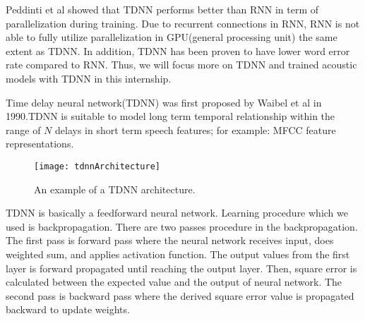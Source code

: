 Peddinti et al showed that TDNN performs better than RNN in term of parallelization during training\cite{Peddinti2015ATD}. Due to recurrent connections in RNN, RNN is not able to fully utilize parallelization in GPU(general processing unit) the same extent as TDNN. In addition, TDNN has been proven to have lower word error rate compared to RNN\cite{Peddinti2015ATD}. Thus, we will focus more on TDNN and trained acoustic models with TDNN in this internship.

Time delay neural network(TDNN) was first proposed by Waibel et al in 1990\cite{Waibel:1990:PRU:108235.108263}.TDNN is suitable to model long term temporal relationship within the range of $N$ delays in short term speech features; for example: MFCC feature representations. %


\begin{figure}

\caption{An example of a TDNN architecture. \cite{Peddinti2015ATD}}
\texttt{[image: tdnnArchitecture]}
\label{tdnnArchitecture}
\centering
\end{figure}



TDNN is basically a feedforward neural network. Learning procedure which we used is backpropagation. There are two passes procedure in the backpropagation. The first pass is forward pass where the neural network receives input, does weighted sum, and applies activation function. The output values from the first layer is forward propagated until reaching the output layer. Then, square error is calculated between the expected value and the output of neural network. The second pass is backward pass where the derived square error value is propagated backward to update weights. 

